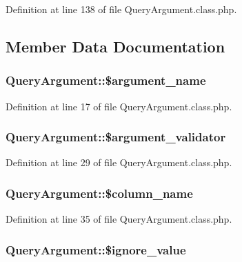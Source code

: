 Definition at line 138 of file Query\-Argument.\-class.\-php.



\subsection{Member Data Documentation}
\hypertarget{classQueryArgument_a90dcd71abf0c257d8cde2ac08de1cc4a}{
\subsubsection[{\$argument\-\_\-name}]{\setlength{\rightskip}{0pt plus 5cm}Query\-Argument\-::\$argument\-\_\-name}}\label{classQueryArgument_a90dcd71abf0c257d8cde2ac08de1cc4a}


Definition at line 17 of file Query\-Argument.\-class.\-php.

\hypertarget{classQueryArgument_a0af5784d1cea24a72fbb59b1fd1905c7}{
\subsubsection[{\$argument\-\_\-validator}]{\setlength{\rightskip}{0pt plus 5cm}Query\-Argument\-::\$argument\-\_\-validator}}\label{classQueryArgument_a0af5784d1cea24a72fbb59b1fd1905c7}


Definition at line 29 of file Query\-Argument.\-class.\-php.

\hypertarget{classQueryArgument_a6574925c4191d63ad3446ea7a9d38020}{
\subsubsection[{\$column\-\_\-name}]{\setlength{\rightskip}{0pt plus 5cm}Query\-Argument\-::\$column\-\_\-name}}\label{classQueryArgument_a6574925c4191d63ad3446ea7a9d38020}


Definition at line 35 of file Query\-Argument.\-class.\-php.

\hypertarget{classQueryArgument_a2833a265532882ef5cb5386894ef503e}{
\subsubsection[{\$ignore\-\_\-value}]{\setlength{\rightskip}{0pt plus 5cm}Query\-Argument\-::\$ignore\-\_\-value}}\label{classQueryArgument_a2833a265532882ef5cb5386894ef503e}


